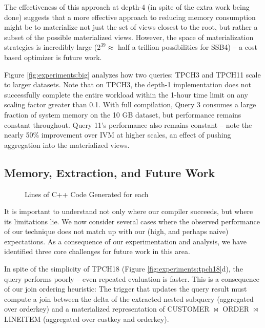 The effectiveness of this approach at depth-4 (in spite of the extra work being done) suggests that a more effective approach to reducing memory consumption might be to materialize not just the set of views closest to the root, but rather a subset of the possible materialized views.  However, the space of materialization strategies is incredibly large ($2^{39} \approx $ half a trillion possibilities for SSB4) -- a cost based optimizer is future work.

Figure \ref{fig:experiments:big} analyzes how two queries: TPCH3 and TPCH11 scale to larger datasets.  Note that on TPCH3, the depth-1 implementation does not successfully complete the entire workload within the 1-hour time limit on any scaling factor greater than 0.1.  With full compilation, Query 3 consumes a large fraction of system memory on the 10 GB dataset, but performance remains constant throughout.  Query 11's performance also remains constant -- note the nearly 50\% improvement over IVM at higher scales, an effect of pushing aggregation into the materialized views.

\subsection{Memory, Extraction, and Future Work}
\label{sec:experiments:future}

\begin{figure}
\begin{center}

\caption{Lines of C++ Code Generated for each}
\label{fig:experiments:loc}
\end{center}
\vspace*{-0.2in}
\end{figure}

It is important to understand not only where our compiler succeeds, but where its limitations lie.  We now consider several cases where the observed performance of our technique does not match up with our (high, and perhaps naive) expectations.  As a consequence of our experimentation and analysis, we have identified three core challenges for future work in this area.

In spite of the simplicity of TPCH18 (Figure \ref{fig:experiments:tpch18}d), the query performs poorly -- even repeated evaluation is faster.  This is a consequence of our join ordering heuristic: The trigger that updates the query result must compute a join between the delta of the extracted nested subquery (aggregated over orderkey) and a materialized representation of CUSTOMER $\bowtie$ ORDER $\bowtie$ LINEITEM (aggregated over custkey and orderkey).  

